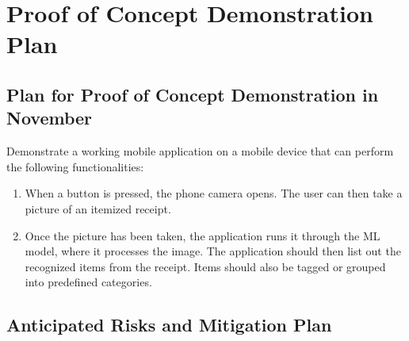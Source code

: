 \documentclass{article}
\begin{document}
\newpage

\section{Proof of Concept Demonstration Plan}

\subsection{Plan for Proof of Concept Demonstration in November}
Demonstrate a working mobile application on a mobile device that can perform the
following functionalities:
\begin{enumerate}
    \item When a button is pressed, the phone camera opens. The user can then
    take a picture of an itemized receipt.
    \item Once the picture has been taken, the application runs it through the
    ML model, where it processes the image. The application should then list out
    the recognized items from the receipt. Items should also be tagged or
    grouped into predefined categories.
\end{enumerate}

\subsection{Anticipated Risks and Mitigation Plan}
\end{document}
